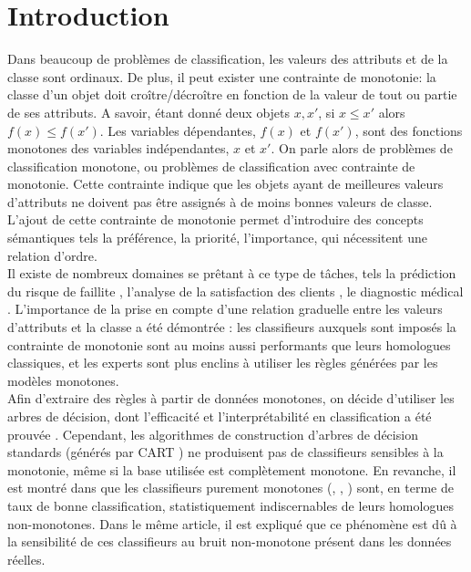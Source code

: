 \documentclass[a4paper]{article}
\begin{document}
\newpage

\section{Introduction} Dans beaucoup de problèmes de classification, les valeurs
des attributs et de la classe sont ordinaux. De plus, il peut exister une
contrainte de monotonie: la classe d'un objet doit croître/décroître en fonction
de la valeur de tout ou partie de ses attributs.  A savoir, étant donné deux
objets $x, x'$, si $x \leq x'$ alors $f(x) \leq f(x')$. Les variables
dépendantes, $f(x)$ et $f(x')$, sont des fonctions monotones des variables
indépendantes, $x$ et $x'$.
On parle alors de problèmes de classification monotone, ou problèmes de
classification avec contrainte de monotonie. Cette contrainte indique que les
objets ayant de meilleures valeurs d'attributs ne doivent pas être assignés à de
moins bonnes valeurs de classe.\\
L'ajout de cette contrainte de monotonie permet d'introduire des concepts
sémantiques tels la préférence, la priorité, l'importance, qui nécessitent une
relation d'ordre.\\ Il existe de nombreux domaines se prêtant à ce type de
tâches, tels la prédiction du risque de faillite \cite{greco-new-bankruptcy},
l'analyse de la satisfaction des clients \cite{greco-customer}, le diagnostic
médical \cite{marsala-gradual}. 
L'importance de la prise en compte d'une relation graduelle entre les valeurs
d'attributs et la classe a été démontrée \cite{pazzani-acceptance}: les
classifieurs auxquels sont imposés la contrainte de monotonie sont au moins
aussi performants que leurs homologues classiques, et les experts sont plus
enclins à utiliser les règles générées par les modèles monotones.\\
Afin d'extraire des règles à partir de données monotones, on décide d'utiliser
les arbres de décision, dont l'efficacité et l'interprétabilité en
classification a été prouvée \cite{quinlan-induction}.  Cependant, les
algorithmes de construction d'arbres de décision standards (générés par CART
\cite{leo-classification}) ne produisent pas de classifieurs sensibles à la
monotonie, même si la base utilisée est complètement monotone.  En revanche, il
est montré dans \cite{ben-adding} que les classifieurs purement monotones
(\cite{ben-learning}, \cite{ben-monotonicity}, \cite{cao-consistent}) sont, en
terme de taux de bonne classification, statistiquement indiscernables de leurs
homologues non-monotones.  Dans le même article, il est expliqué que ce
phénomène est dû à la sensibilité de ces classifieurs au bruit non-monotone
présent dans les données réelles. \\
\end{document}
